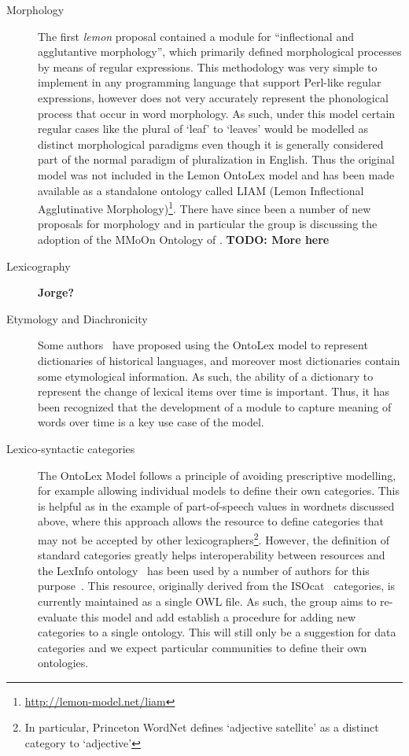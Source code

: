 \documentclass[12pt,a4paper]{elex2017}
\begin{document}
\begin{description}
    \item[Morphology] The first \emph{lemon} proposal contained a module for
        ``inflectional and agglutantive morphology'', which primarily defined
        morphological processes by means of regular expressions. This
        methodology was very simple to implement in any programming language
        that support Perl-like regular expressions, however does not very
        accurately represent the phonological process that occur in word
        morphology. As such, under this model certain regular cases like the
        plural of `leaf' to `leaves' would be modelled as distinct morphological
        paradigms even though it is generally considered part of the normal paradigm of
        pluralization in English. Thus the original model was not included in
        the Lemon OntoLex model and has been made available as
        a standalone ontology called LIAM (Lemon Inflectional Agglutinative
        Morphology)\footnote{\url{http://lemon-model.net/liam}}. There have
        since been a number of new proposals for morphology and in particular
        the group is discussing the adoption of the MMoOn Ontology of
        \citep{MMoOn_heb}. \textbf{TODO: More here}
    \item[Lexicography] \textbf{Jorge?}
    \item[Etymology and Diachronicity] Some authors~\citep{khan2014using,abromeit2016linking} have
        proposed using the OntoLex model to represent dictionaries of historical
        languages, and moreover most dictionaries contain some etymological
        information. As such, the ability of a dictionary to represent the
        change of lexical items over time is important. Thus, it has been
        recognized that the development of a module to capture meaning of words
        over time is a key use case of the model.
    \item[Lexico-syntactic categories] The OntoLex Model follows a principle of
        avoiding prescriptive modelling, for example allowing individual models
        to define their own categories. This is helpful as in the example
        of part-of-speech values in wordnets discussed above, where this
        approach allows the resource to define categories that may not be
        accepted by other lexicographers\footnote{In particular, Princeton
        WordNet defines `adjective satellite' as a distinct category to
        `adjective'}. However, the definition of standard categories greatly
        helps interoperability between resources and the LexInfo
        ontology~\citep{cimiano2011lexinfo} has been used by a number of authors
        for this
        purpose~\citep{buitelaar2013linguistic,villegas2015parole,serasset2015dbnary}. 
        This resource, originally derived from the
        ISOcat~\citep{kemps2008isocat} categories, is currently maintained as a
        single OWL file. As such, the group aims to re-evaluate this model and
        add establish a procedure for adding new categories to a single
        ontology. This will still only be a suggestion for data categories
        and we expect particular communities to define their own ontologies.
\end{description}
\end{document}

